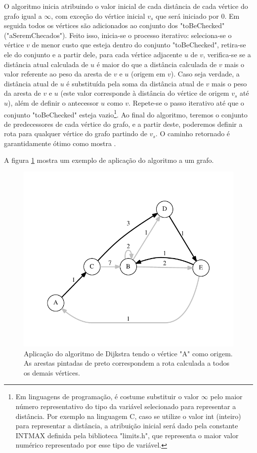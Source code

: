 O algoritmo inicia atribuindo o valor inicial de cada distância de cada vértice do grafo igual a $\infty$, com exceção do vértice inicial $v_{s}$ que será iniciado por 0. Em seguida todos os vértices são adicionados ao conjunto dos "toBeChecked" ("aSeremChecados"). Feito isso, inicia-se o processo iterativo: seleciona-se o vértice $v$ de menor custo que esteja dentro do conjunto "toBeChecked", retira-se ele do conjunto e a partir dele, para cada vértice adjacente $u$ de $v$, verifica-se se a distância atual calculada de $u$ é maior do que a distância calculada de $v$ mais o valor referente ao peso da aresta de $v$ e $u$ (origem em $v$). Caso seja verdade, a distância atual de $u$ é substituída pela soma da distância atual de $v$ mais o peso da aresta de $v$ e $u$ (este valor corresponde à distância do vértice de origem $v_{s}$ até $u$), além de definir o antecessor $u$ como $v$. Repete-se o passo iterativo até que o conjunto "toBeChecked" esteja vazio\footnote{Em linguagens de programação, é costume substituir o valor $\infty$ pelo maior número representativo do tipo da variável selecionado para representar a distância. Por exemplo na linguagem C, caso se utilize o valor int (inteiro) para representar a distância, a atribuição inicial será dado pela constante INT\underline{\space}MAX  definida pela biblioteca "limits.h", que representa o maior valor numérico representado por esse tipo de variável.}.
\newpage
Ao final do algoritmo, teremos o conjunto de predecessores de cada vértice do grafo, e a partir deste, poderemos definir a rota para qualquer vértice do grafo partindo de $v_{s}$. O caminho retornado é garantidamente ótimo como mostra .

A figura \ref{fig-dijkstra-algoritmo-grafo} mostra um exemplo de aplicação do algoritmo a um grafo.

\begin{figure}[H]
\centering
\includegraphics[width=1.\textwidth]{figuras/grafo-dijkstra} 
\caption{Aplicação do algoritmo de Dijkstra tendo o vértice "A" como origem. As arestas pintadas de preto correspondem a rota calculada a todos os demais vértices.}
\label{fig-dijkstra-algoritmo-grafo}
\end{figure}

